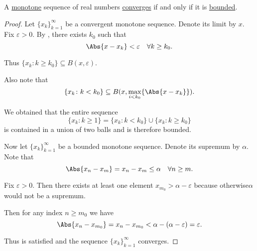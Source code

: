 \begin{proposition}\label{thm:real_monotone_sequence_converges_iff_bounded}
  A \hyperref[def:monotone_map]{monotone} sequence of real numbers \hyperref[def:net_convergence/limit]{converges} if and only if it is \hyperref[def:metric_space/bounded_sequence]{bounded}.
\end{proposition}
\begin{proof}
  \Sufficiency Let \( \{ x_k \}_{k=1}^\infty \) be a convergent monotone sequence. Denote its limit by \( x \). Fix \( \varepsilon > 0 \). By , there exists \( k_0 \) such that
  \begin{equation*}
    \Abs{x - x_k} < \varepsilon \quad\forall k \geq k_0.
  \end{equation*}

  Thus \( \{ x_k \colon k \geq k_0 \} \subseteq B(x, \varepsilon) \).

  Also note that
  \begin{equation*}
    \{ x_k \colon k < k_0 \} \subseteq B(x, \max_{i < k_0} \{ \Abs{x - x_k} \}).
  \end{equation*}

  We obtained that the entire sequence
  \begin{equation*}
    \{ x_k \colon k \geq 1 \} = \{ x_k \colon k < k_0 \} \cup \{ x_k \colon k \geq k_0 \}
  \end{equation*}
  is contained in a union of two balls and is therefore bounded.

  \Necessity Now let \( \{ x_k \}_{k=1}^\infty \) be a bounded monotone sequence. Denote its supremum by \( \alpha \). Note that
  \begin{equation*}
    \Abs{x_n - x_m} = x_n - x_m \leq \alpha \quad\forall n \geq m.
  \end{equation*}

  Fix \( \varepsilon > 0 \). Then there exists at least one element \( x_{m_0} > \alpha - \varepsilon \) because otherwise\LEM \( \alpha \) would not be a supremum.

  Then for any index \( n \geq m_0 \) we have
  \begin{equation*}
    \Abs{x_n - x_{m_0}} = x_n - x_{m_0} < \alpha - (\alpha - \varepsilon) = \varepsilon.
  \end{equation*}

  Thus  is satisfied and the sequence \( \{ x_k \}_{k=1}^\infty \) converges.
\end{proof}
